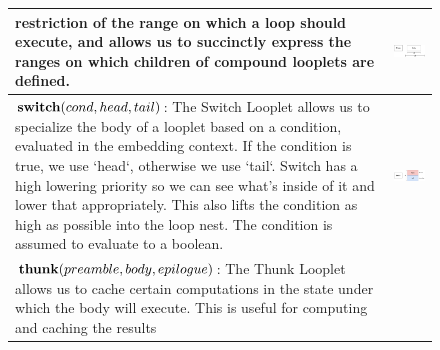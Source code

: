 \begin{figure}[ht]
\begin{tabular} {|l|c|}
\begin{minipage}[c]{0.65\linewidth}
        restriction of the range on which a loop should execute, and allows us
        to succinctly express the ranges on which children of compound looplets
        are defined.
    \end{minipage} &
    \begin{minipage}[c]{0.25\linewidth}
        \centering
        \includegraphics[scale=0.20]{Looplets-phase.png}
    \end{minipage} \\ \hline
    \begin{minipage}[c]{0.65\linewidth}
        $\text{\textbf{switch}}(cond, head, tail)$: The Switch Looplet allows
        us to specialize the body of a looplet based on a condition, evaluated
        in the embedding context. If the condition is true, we use `head`,
        otherwise we use `tail`. Switch has a high lowering priority so we can
        see what's inside of it and lower that appropriately. This also lifts
        the condition as high as possible into the loop nest. The condition is
        assumed to evaluate to a boolean.
    \end{minipage} &
    \begin{minipage}[c]{0.25\linewidth}
        \centering
        \includegraphics[scale=0.20]{Looplets-switch.png}
    \end{minipage} \\ \hline
    \begin{minipage}[c]{0.65\linewidth}
        $\text{\textbf{thunk}}(preamble, body, epilogue)$: The Thunk Looplet
        allows us to cache certain computations in the state under which the
        body will execute. This is useful for computing and caching the results

\end{minipage}
\end{tabular}
\end{figure}
